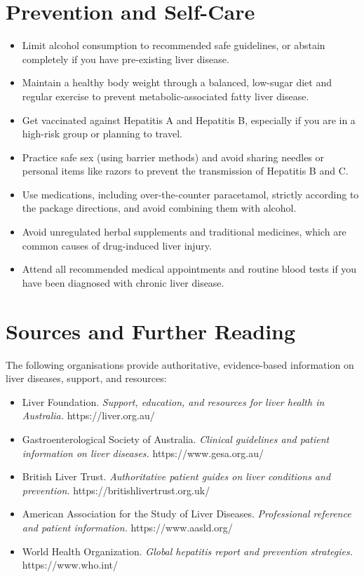 \section*{Prevention and Self-Care}
\begin{itemize}
    \item Limit alcohol consumption to recommended safe guidelines, or abstain completely if you have pre-existing liver disease.
    \item Maintain a healthy body weight through a balanced, low-sugar diet and regular exercise to prevent metabolic-associated fatty liver disease.
    \item Get vaccinated against Hepatitis A and Hepatitis B, especially if you are in a high-risk group or planning to travel.
    \item Practice safe sex (using barrier methods) and avoid sharing needles or personal items like razors to prevent the transmission of Hepatitis B and C.
    \item Use medications, including over-the-counter paracetamol, strictly according to the package directions, and avoid combining them with alcohol.
    \item Avoid unregulated herbal supplements and traditional medicines, which are common causes of drug-induced liver injury.
    \item Attend all recommended medical appointments and routine blood tests if you have been diagnosed with chronic liver disease.
\end{itemize}

\section*{Sources and Further Reading}
The following organisations provide authoritative, evidence-based information on liver diseases, support, and resources:
\begin{itemize}
    \item Liver Foundation. \textit{Support, education, and resources for liver health in Australia.} https://liver.org.au/
    \item Gastroenterological Society of Australia. \textit{Clinical guidelines and patient information on liver diseases.} https://www.gesa.org.au/
    \item British Liver Trust. \textit{Authoritative patient guides on liver conditions and prevention.} https://britishlivertrust.org.uk/
    \item American Association for the Study of Liver Diseases. \textit{Professional reference and patient information.} https://www.aasld.org/
    \item World Health Organization. \textit{Global hepatitis report and prevention strategies.} https://www.who.int/
\end{itemize}
